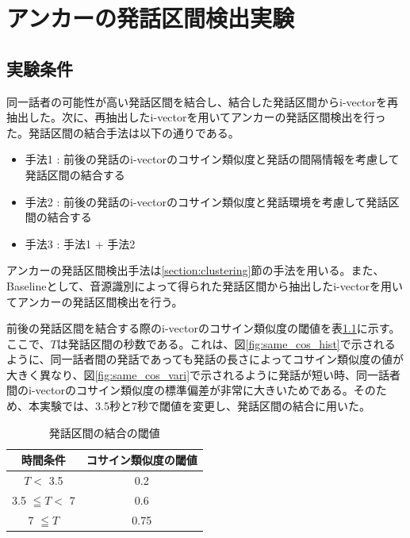 \chapter{アンカーの発話区間検出実験}
\label{chapter:get_anchor}

\section{実験条件}
同一話者の可能性が高い発話区間を結合し、結合した発話区間からi-vectorを再抽出した。次に、再抽出したi-vectorを用いてアンカーの発話区間検出を行った。発話区間の結合手法は以下の通りである。

\begin{itemize}
\item 手法1 : 前後の発話のi-vectorのコサイン類似度と発話の間隔情報を考慮して発話区間の結合する
\item 手法2 : 前後の発話のi-vectorのコサイン類似度と発話環境を考慮して発話区間の結合する
\item 手法3 : 手法1 + 手法2
\end{itemize}

アンカーの発話区間検出手法は\ref{section:clustering}節の手法を用いる。また、Baselineとして、音源識別によって得られた発話区間から抽出したi-vectorを用いてアンカーの発話区間検出を行う。


前後の発話区間を結合する際のi-vectorのコサイン類似度の閾値を表\ref{table:decide_thcos}に示す。ここで、$T$は発話区間の秒数である。これは、図\ref{fig:same_cos_hist}で示されるように、同一話者間の発話であっても発話の長さによってコサイン類似度の値が大きく異なり、図\ref{fig:same_cos_vari}で示されるように発話が短い時、同一話者間のi-vectorのコサイン類似度の標準偏差が非常に大きいためである。そのため、本実験では、3.5秒と7秒で閾値を変更し、発話区間の結合に用いた。

\begin{table}[H]
  \begin{center}
    \caption{発話区間の結合の閾値 \label{table:decide_thcos}}
    \begin{tabular}{|c||c|} \hline
時間条件 & コサイン類似度の閾値  \\ \hline
$T <$ 3.5 &  0.2 \\ \hline
3.5 $\leqq T <$ 7 &  0.6  \\ \hline
7 $\leqq T$ &  0.75 \\ \hline
    \end{tabular}
  \end{center}
\end{table}

